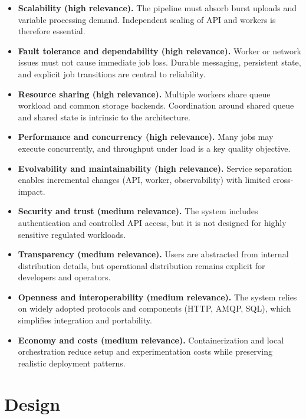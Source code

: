 \documentclass{scrartcl}
\begin{document}
\begin{itemize}
  \item \textbf{Scalability (high relevance).} The pipeline must absorb burst uploads and variable processing demand.
  Independent scaling of API and workers is therefore essential.

  \item \textbf{Fault tolerance and dependability (high relevance).} Worker or network issues must not cause immediate job loss.
  Durable messaging, persistent state, and explicit job transitions are central to reliability.

  \item \textbf{Resource sharing (high relevance).} Multiple workers share queue workload and common storage backends.
  Coordination around shared queue and shared state is intrinsic to the architecture.

  \item \textbf{Performance and concurrency (high relevance).} Many jobs may execute concurrently, and throughput under load is a key quality objective.

  \item \textbf{Evolvability and maintainability (high relevance).} Service separation enables incremental changes (API, worker, observability) with limited cross-impact.

  \item \textbf{Security and trust (medium relevance).} The system includes authentication and controlled API access, but it is not designed for highly sensitive regulated workloads.

  \item \textbf{Transparency (medium relevance).} Users are abstracted from internal distribution details, but operational distribution remains explicit for developers and operators.

  \item \textbf{Openness and interoperability (medium relevance).} The system relies on widely adopted protocols and components (HTTP, AMQP, SQL), which simplifies integration and portability.

  \item \textbf{Economy and costs (medium relevance).} Containerization and local orchestration reduce setup and experimentation costs while preserving realistic deployment patterns.
\end{itemize}

\section{Design}\label{design}
\end{document}
